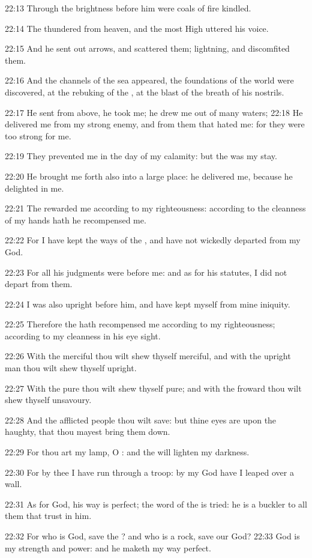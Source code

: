 22:13 Through the brightness before him were coals of fire kindled.

22:14 The \LORD thundered from heaven, and the most High uttered his voice.

22:15 And he sent out arrows, and scattered them; lightning, and discomfited them.

22:16 And the channels of the sea appeared, the foundations of the world were discovered, at the rebuking of the \LORD, at the blast of the breath of his nostrils.

22:17 He sent from above, he took me; he drew me out of many waters; 22:18 He delivered me from my strong enemy, and from them that hated me: for they were too strong for me.

22:19 They prevented me in the day of my calamity: but the \LORD was my stay.

22:20 He brought me forth also into a large place: he delivered me, because he delighted in me.

22:21 The \LORD rewarded me according to my righteousness: according to the cleanness of my hands hath he recompensed me.

22:22 For I have kept the ways of the \LORD, and have not wickedly departed from my God.

22:23 For all his judgments were before me: and as for his statutes, I did not depart from them.

22:24 I was also upright before him, and have kept myself from mine iniquity.

22:25 Therefore the \LORD hath recompensed me according to my righteousness; according to my cleanness in his eye sight.

22:26 With the merciful thou wilt shew thyself merciful, and with the upright man thou wilt shew thyself upright.

22:27 With the pure thou wilt shew thyself pure; and with the froward thou wilt shew thyself unsavoury.

22:28 And the afflicted people thou wilt save: but thine eyes are upon the haughty, that thou mayest bring them down.

22:29 For thou art my lamp, O \LORD: and the \LORD will lighten my darkness.

22:30 For by thee I have run through a troop: by my God have I leaped over a wall.

22:31 As for God, his way is perfect; the word of the \LORD is tried: he is a buckler to all them that trust in him.

22:32 For who is God, save the \LORD? and who is a rock, save our God?  22:33 God is my strength and power: and he maketh my way perfect.

